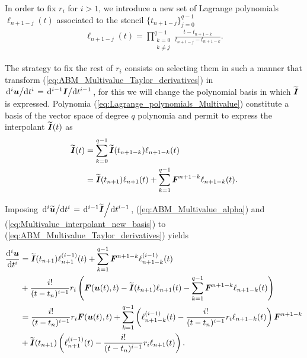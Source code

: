In order to fix $r_i$ for $i>1$, we introduce a new set of Lagrange polynomials $\ell_{n+1-j}(t)$ associated to the stencil $\{t_{n+1-j}\}_{j=0}^{q-1}$ 
%
\begin{align}
	{\ell}_{n+1-j}(t)
	=
	\prod_{\substack{k=0\\k\ne j}}^{q-1}
	\frac{t-t_{n+1-k}}{t_{n+1-j}-t_{n+1-k}}.
	\label{eq:Lagrange_polynomials_Multivalue}
\end{align}

The strategy to fix the rest of $r_i$ consists on selecting them in such a manner that transform (\ref{eq:ABM_Multivalue_Taylor_derivatives}) in $\dv*[i]{ \boldsymbol{u} }{t} = \dv*[i-1]{ \boldsymbol{I} }{t}$, for this we will change the polynomial basis in which $\widetilde{\boldsymbol{I}}$ is expressed. Polynomia  (\ref{eq:Lagrange_polynomials_Multivalue}) constitute a basis of the vector space of degree $q$ polynomia and permit to express the interpolant $\widetilde{\boldsymbol{I}}(t)$ as
%
\begin{align}
	\boldsymbol{\widetilde{ \boldsymbol{I}} }(t)
	& =
	\sum_{k=0}^{q-1}
	\widetilde{\boldsymbol{I}}(t_{n+1-k})
	\ell_{n+1-k}(t)
	\nonumber
	\\
	&
	 =
	\widetilde{\boldsymbol{I}}(t_{n+1})
	\ell_{n+1}(t)
	+
	\sum_{k=1}^{q-1}
	\boldsymbol{F}^{n+1-k}
	\ell_{n+1-k}(t).
	\label{eq:Multivalue_interpolant_new_basis}
\end{align}

Imposing $\dv*[i]{\widetilde{\boldsymbol{u}}}{t} = \dv*[i-1]{\widetilde{\boldsymbol{I}}}{t}$, (\ref{eq:ABM_Multivalue_alpha}) and (\ref{eq:Multivalue_interpolant_new_basis}) to (\ref{eq:ABM_Multivalue_Taylor_derivatives}) yields
%
\begin{align}
	\dv[i]{ \boldsymbol{u} }{t}
	&
	=
	\widetilde{\boldsymbol{I}}(t_{n+1})
	\ell_{n+1}^{(i-1)}(t)
	+
	\sum_{k=1}^{q-1}
	\boldsymbol{F}^{n+1-k}
	\ell_{n+1-k}^{(i-1)}(t)
	\nonumber
	\\
	&	
	+
	\frac{i!}{(t-t_n)^{i-1}} 
	r_i
	\left(
	\boldsymbol{F}(\boldsymbol{u}(t),t)
	-
	\widetilde{\boldsymbol{I}}(t_{n+1})
	\ell_{n+1}(t)
	-
	\sum_{k=1}^{q-1}
	\boldsymbol{F}^{n+1-k}
	\ell_{n+1-k}(t)
	\right)
	\nonumber
	\\
	&
	=
	\frac{i!}{(t-t_n)^{i-1}} 
	r_i
	\boldsymbol{F}(\boldsymbol{u}(t),t)+
	\sum_{k=1}^{q-1}
	\left(
	\ell_{n+1-k}^{(i-1)}(t)
	-
	\frac{i!}{(t-t_n)^{i-1}} 
	r_i
	\ell_{n+1-k}(t)
	\right)
	\boldsymbol{F}^{n+1-k}
	\nonumber
	\\
	&
	+
	\widetilde{\boldsymbol{I}}(t_{n+1})
	\left(
	\ell_{n+1}^{(i-1)}(t)
	-
	\frac{i!}{(t-t_n)^{i-1}} 
	r_i
	\ell_{n+1}(t)
	\right)
	.
	\label{eq:ABM_Multivalue_Derivatives_r_i_t}
\end{align}

